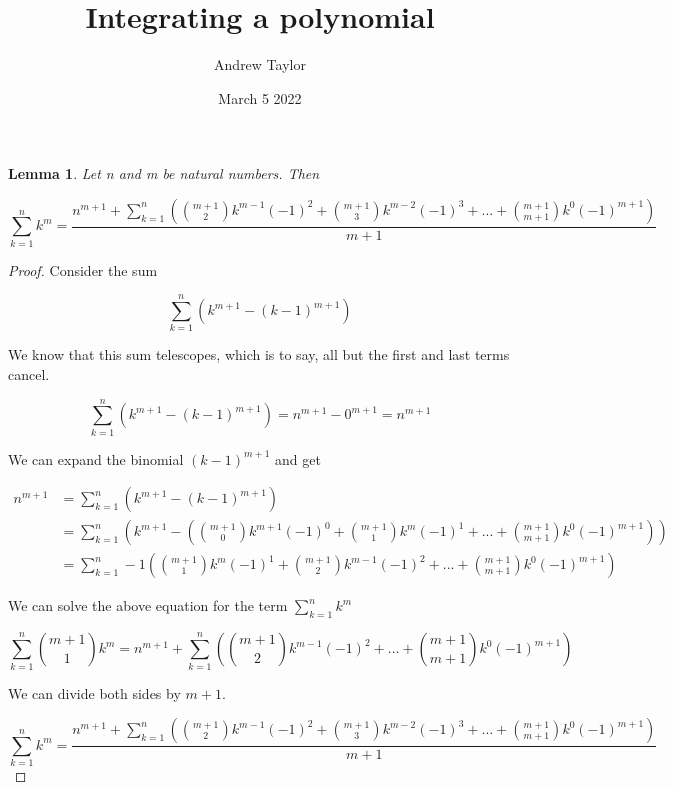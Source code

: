 \documentclass{article}
\title{Integrating a polynomial}
\author{Andrew Taylor}
\date{March 5 2022}
\newtheorem{lemma}{Lemma}
\begin{document}
\maketitle

\begin{lemma}
Let n and m be natural numbers. Then

\begin{equation*}
\sum_{k=1}^{n} k^{m} = \frac{n^{m+1} + \displaystyle \sum_{k=1}^{n} \left( \binom{m+1}{2} k^{m-1} (-1)^2 +  \binom{m+1}{3} k^{m-2} (-1)^3 + ... +  \binom{m+1}{m+1} k^{0} (-1)^{m+1} \right) }{m+1}
\end{equation*}
\end{lemma}

\begin{proof}
Consider the sum 

\begin{equation*}
\sum_{k=1}^{n} \left( k^{m+1} - (k-1)^{m+1} \right)
\end{equation*}

We know that this sum telescopes, which is to say, all but the first and last terms cancel.

\begin{equation*}
\sum_{k=1}^{n} \left( k^{m+1} - (k-1)^{m+1} \right) = n^{m+1} - 0^{m+1} = n^{m+1}
\end{equation*}

We can expand the binomial $(k-1)^{m+1}$ and get

\begin{align*}
n^{m+1} &= \sum_{k=1}^{n} \left( k^{m+1} - (k-1)^{m+1} \right) \\
&= \sum_{k=1}^{n} \left( k^{m+1} - \left( \binom{m+1}{0} k^{m+1} (-1)^{0} + \binom{m+1}{1} k^{m} (-1)^{1} + ... + \binom{m+1}{m+1} k^{0} (-1)^{m+1} \right) \right) \\
&= \sum_{k=1}^{n} -1 \left( \binom{m+1}{1} k^{m} (-1)^{1} + \binom{m+1}{2} k^{m-1} (-1)^{2} + ... + \binom{m+1}{m+1} k^{0} (-1)^{m+1} \right)  
\end{align*}

We can solve the above equation for the term $\displaystyle \sum_{k=1}^{n} k^{m}$

\begin{equation*}
\sum_{k=1}^{n} \binom{m+1}{1} k^{m} = n^{m+1} + \displaystyle \sum_{k=1}^{n} \left( \binom{m+1}{2} k^{m-1} (-1)^{2} + ... + \binom{m+1}{m+1} k^{0} (-1)^{m+1} \right) 
\end{equation*}

We can divide both sides by $m+1$.

\begin{equation*}
\sum_{k=1}^{n} k^{m} = \frac{n^{m+1} + \displaystyle \sum_{k=1}^{n} \left( \binom{m+1}{2} k^{m-1} (-1)^2 +  \binom{m+1}{3} k^{m-2} (-1)^3 + ... +  \binom{m+1}{m+1} k^{0} (-1)^{m+1} \right) }{m+1}
\end{equation*}

\end{proof}
\end{document}
